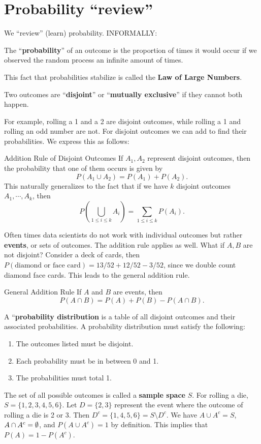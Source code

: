 \section{Probability ``review''} 

We ``review'' (learn) probability. INFORMALLY:
\begin{definition}
   The ``\textbf{probability}'' of an outcome is the proportion of times it would occur if we observed the random process an infinite amount of times. 
\end{definition}
This fact that probabilities stabilize is called the \textbf{Law of Large Numbers}.
\begin{definition}[]
    Two outcomes are ``\textbf{disjoint}'' or ``\textbf{mutually exclusive}'' if they cannot both happen. 
\end{definition}
For example, rolling a 1 and a 2 are disjoint outcomes, while rolling a 1 and rolling an odd number are not. For disjoint outcomes we can add to find their probabilities. We express this as follows:
\begin{namedthing}{Addition Rule of Disjoint Outcomes} 
   If $A_1,A_2$ represent disjoint outcomes, then the probability that one of them occurs is given by \[
       P(A_1 \cup A_2) = P(A_1) +P(A_2).
   \] 
This naturally generalizes to the fact that if we have $k$ disjoint outcomes $A_1,\cdots ,A_k$, then \[
    P\left( \bigcup_{1 \leq i \leq k}A_i   \right) = \sum _{1 \leq i \leq k}P(A_i ).
\] 
\end{namedthing}
Often times data scientists do not work with individual outcomes but rather \textbf{events}, or sets of outcomes. The addition rule applies as well. What if $A,B$ are not disjoint? Consider a deck of cards, then $P(\text{diamond or face card})=13/52+12/52-3/52$, since we double count diamond face cards. This leads to the general addition rule.

\begin{namedthing}{General Addition Rule} 
   If $A$ and $B$ are events, then \[
       P(A \cap B) = P(A)+P(B) - P(A \cap B).
   \] 
\end{namedthing}
\begin{definition}[]
    A ``\textbf{probability distribution} is a table of all disjoint outcomes and their associated probabilities. A probability distribution must satisfy the following:
    \begin{enumerate}[label=(\arabic*)]
    \setlength\itemsep{-.2em}
        \item The outcomes listed must be disjoint.
        \item Each probability must be in between 0 and 1.
        \item The probabilities must total 1.
    \end{enumerate}
\end{definition}
The set of all possible outcomes is called a \textbf{sample space} $S$. For rolling a die, $S=\{1,2,3,4,5,6\} $. Let $D=\{2,3\} $ represent the event where the outcome of rolling a die is 2 or 3. Then $D^c =\{1,4,5,6\} =S \setminus D^c.$ We have $A \cup A^c=S$, $A \cap A^c=\emptyset$, and $P(A \cup A^c)=1$ by definition. This implies that $P(A)=1-P(A^c)$.

